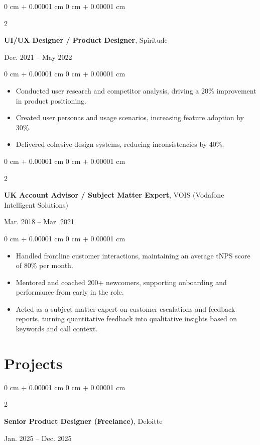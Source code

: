 \documentclass[10pt, letterpaper]{article}
\newenvironment{highlights}{
    \begin{itemize}[
        topsep=0.08 cm,
        parsep=0.10 cm,
        partopsep=0pt,
        itemsep=0.04 cm,
        leftmargin=0 cm + 10pt
    ]
}{
    \end{itemize}
} %
\newenvironment{onecolentry}{
    \begin{adjustwidth}{
        0 cm + 0.00001 cm
    }{
        0 cm + 0.00001 cm
    }
}{
    \end{adjustwidth}
} %
\newenvironment{twocolentry}[2][]{
    \onecolentry
    \def\secondColumn{#2}
    \setcolumnwidth{\fill, 4.5 cm}
    \begin{paracol}{2}
}{
    \switchcolumn \raggedleft \secondColumn
    \end{paracol}
    \endonecolentry
} %
\begin{document}
\vspace{0.48 cm}

\begin{twocolentry}{Dec. 2021 -- May 2022}
    \textbf{UI/UX Designer / Product Designer}, Spiritude
\end{twocolentry}

\vspace{0.14 cm}
\begin{onecolentry}
    \begin{highlights}
        \item Conducted user research and competitor analysis, driving a 20\% improvement in product positioning.
        \item Created user personas and usage scenarios, increasing feature adoption by 30\%.
        \item Delivered cohesive design systems, reducing inconsistencies by 40\%.
    \end{highlights}
\end{onecolentry}

\vspace{0.48 cm}

\begin{twocolentry}{Mar. 2018 -- Mar. 2021}
    \textbf{UK Account Advisor / Subject Matter Expert}, VOIS (Vodafone Intelligent Solutions)
\end{twocolentry}

\vspace{0.14 cm}
\begin{onecolentry}
    \begin{highlights}
        \item Handled frontline customer interactions, maintaining an average tNPS score of 80\% per month.
        \item Mentored and coached 200+ newcomers, supporting onboarding and performance from early in the role.
        \item Acted as a subject matter expert on customer escalations and feedback reports, turning quantitative feedback into qualitative insights based on keywords and call context.
    \end{highlights}
\end{onecolentry}


    \section{Projects}
    \begin{twocolentry}{Jan. 2025 -- Dec. 2025}
        \textbf{Senior Product Designer (Freelance)}, Deloitte
    \end{twocolentry}
\end{document}
